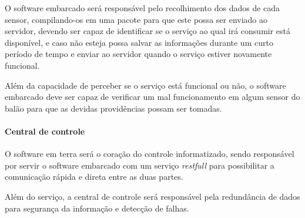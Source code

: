 O software embarcado será responsável pelo recolhimento dos dados de cada sensor, compilando-os em uma pacote para que este possa ser enviado ao servidor, devendo ser capaz de identificar se o serviço ao qual irá consumir está disponível, e caso não esteja possa salvar as informações durante um curto período de tempo e enviar ao servidor quando o serviço estiver novamente funcional.

Além da capacidade de perceber se o serviço está funcional ou não, o software embarcado deve ser capaz de verificar um mal funcionamento em algum sensor do balão para que as devidas providências possam ser tomadas.

\paragraph{Central de controle}

O software em terra será o coração do controle informatizado, sendo responsável por servir o software embarcado com um serviço \textit{restfull} para possibilitar a comunicação rápida e direta entre as duas partes.

Além do serviço, a central de controle será responsável pela redundância de dados para segurança da informação e detecção de falhas.

